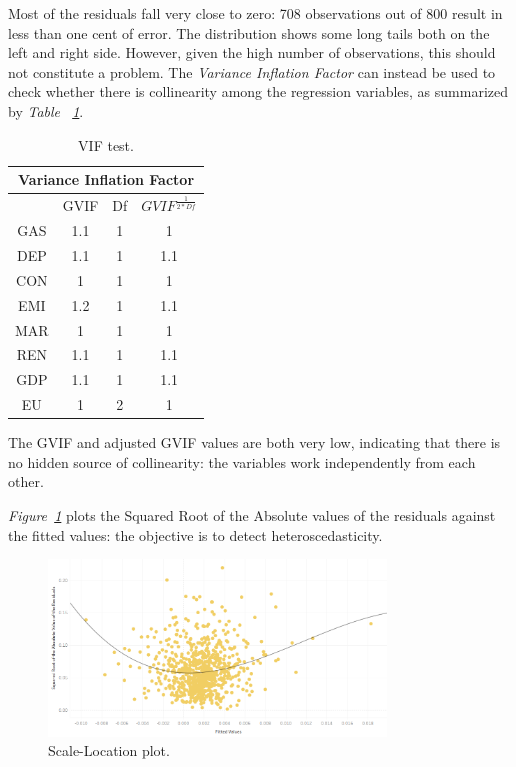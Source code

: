 \documentclass[a4paper,12pt]{book}
\begin{document}
Most of the residuals fall very close to zero: 708 observations out of 800 result in less than one cent of error. The distribution shows some long tails both on the left and right side. However, given the high number of observations, this should not constitute a problem. The \textit{Variance Inflation Factor} can instead be used to check whether there is collinearity among the regression variables, as summarized by \textit{Table ~\ref{Tab:coll}}.

\begin{table}[tb]
\begin{center}
\begin{tabular}{|c|c|c|c|}
\hline
\multicolumn{4}{|c|}{Variance Inflation Factor}\\
\hline
&GVIF&Df&$GVIF^{\frac{1}{2*Df}}$\\
\hline
GAS&1.1&1&1\\
DEP&1.1&1&1.1\\
CON&1&1&1\\
EMI&1.2&1&1.1\\
MAR&1&1&1\\
REN&1.1&1&1.1\\
GDP&1.1&1&1.1\\
EU&1&2&1\\
\hline
\end{tabular}
\caption{VIF test.}
\label{Tab:coll}
\end{center}
\end{table}

The GVIF and adjusted GVIF values are both very low, indicating that there is no hidden source of collinearity: the variables work independently from each other.

\textit{Figure~\ref{fig:hetero}} plots the Squared Root of the Absolute values of the residuals against the fitted values: the objective is to detect heteroscedasticity.

\begin{figure}[tb]
\begin{center}
\captionsetup{justification=centering}
\includegraphics[width=0.8\textwidth]{Images/hetero.png}
\caption{Scale-Location plot.}
\label{fig:hetero}
\end{center}
\end{figure}
\end{document}
